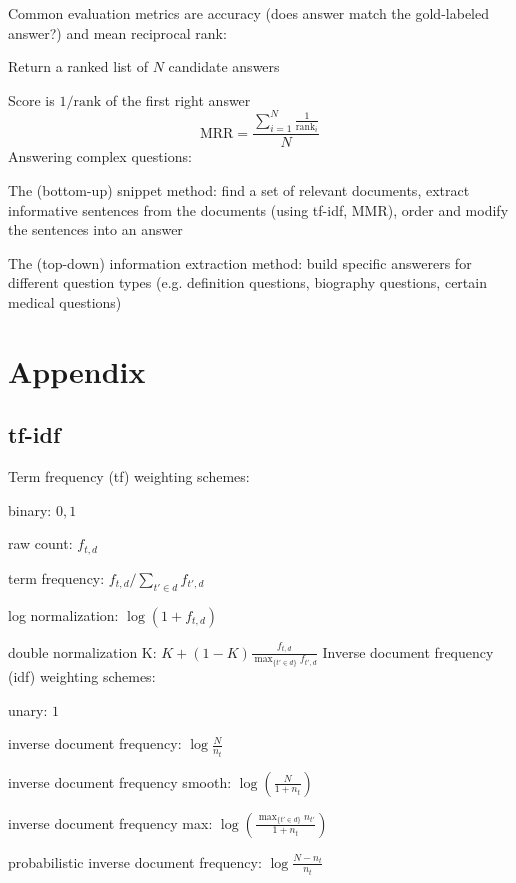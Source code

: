 \documentclass[12pt]{article}
\begin{document}
\par Common evaluation metrics are accuracy (does answer match the gold-labeled answer?) and mean reciprocal rank:
\ulb
\item Return a ranked list of $N$ candidate answers
\item Score is $1/\text{rank}$ of the first right answer
\[ \text{MRR} = \frac{\sum_{i=1}^N \frac{1}{\text{rank}_i}}{N} \]
\ule
Answering complex questions:
\ulb
\item The (bottom-up) snippet method: find a set of relevant documents, extract informative sentences from the documents (using tf-idf, MMR), order and modify the sentences into an answer
\item The (top-down) information extraction method: build specific answerers for different question types (e.g. definition questions, biography questions, certain medical questions)
\ule

\section{Appendix}
\subsection{tf-idf}
Term frequency (tf) weighting schemes:
\ulb
\item binary: $0,1$
\item raw count: $f_{t,d}$
\item term frequency: $f_{t,d} / \sum_{t'\in d}f_{t',d} $
\item log normalization: $\log(1+ f_{t,d})$
\item double normalization K: $K + (1-K) \frac{f_{t,d}}{\max_{\{t'\in d\}}f_{t',d}}$
\ule
Inverse document frequency (idf) weighting schemes:
\ulb
\item unary: $1$
\item inverse document frequency: $\log\frac{N}{n_t}$
\item inverse document frequency smooth: $\log(\frac{N}{1+n_t})$
\item inverse document frequency max: $\log(\frac{\max_{\{t'\in d\}}n_{t'}}{1+n_t})$
\item probabilistic inverse document frequency: $\log\frac{N-n_t}{n_t}$
\ule
\end{document}
